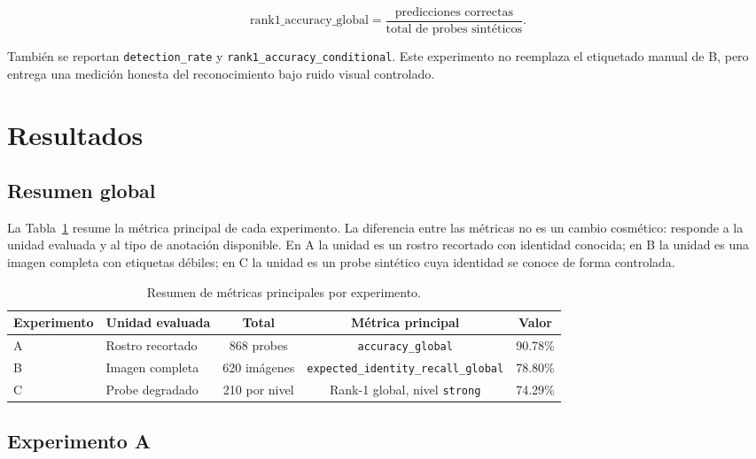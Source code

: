 \documentclass[11pt]{article}
\begin{document}
\begin{equation}
    \text{rank1\_accuracy\_global}
    =
    \frac{\text{predicciones correctas}}{\text{total de probes sintéticos}}.
\end{equation}

También se reportan \texttt{detection\_rate} y \texttt{rank1\_accuracy\_conditional}. Este experimento no reemplaza el etiquetado manual de B, pero entrega una medición honesta del reconocimiento bajo ruido visual controlado.

\section{Resultados}
\label{sec:resultados}

\subsection{Resumen global}

La Tabla~\ref{tab:resumen_exp} resume la métrica principal de cada experimento. La diferencia entre las métricas no es un cambio cosmético: responde a la unidad evaluada y al tipo de anotación disponible. En A la unidad es un rostro recortado con identidad conocida; en B la unidad es una imagen completa con etiquetas débiles; en C la unidad es un probe sintético cuya identidad se conoce de forma controlada.

\begin{table}[H]
\centering
\caption{Resumen de métricas principales por experimento.}
\label{tab:resumen_exp}
\begin{adjustbox}{max width=\textwidth}
\begin{tabular}{llccc}
\toprule
Experimento & Unidad evaluada & Total & Métrica principal & Valor \\
\midrule
A & Rostro recortado & 868 probes & \texttt{accuracy\_global} & 90.78\% \\
B & Imagen completa & 620 imágenes & \texttt{expected\_identity\_recall\_global} & 78.80\% \\
C & Probe degradado & 210 por nivel & Rank-1 global, nivel \texttt{strong} & 74.29\% \\
\bottomrule
\end{tabular}
\end{adjustbox}
\end{table}

\subsection{Experimento A}
\end{document}
